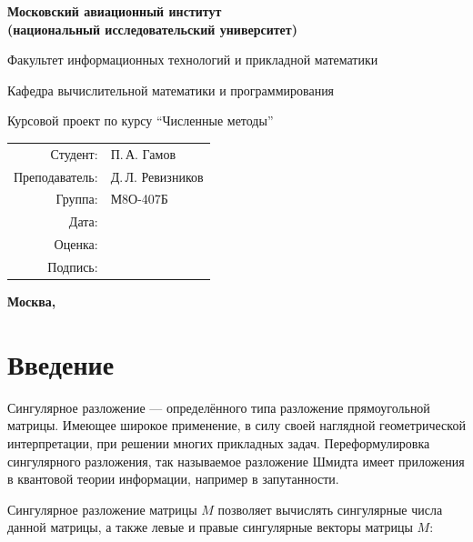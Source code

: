\documentclass[pdf, unicode, 12pt, a4paper,oneside,fleqn]{article}
\begin{document}
\begin{titlepage}
\begin{center}
\bfseries
{\Large Московский авиационный институт\\ (национальный исследовательский университет)}

\vspace{48pt}
{\large Факультет информационных технологий и прикладной математики}

\vspace{36pt}
{\large Кафедра вычислительной математики и программирования}

\vspace{48pt}Курсовой проект по курсу 
\enquote{Численные методы}
\end{center}
\vspace{72pt}

\begin{flushright}
\begin{tabular}{rl}
Студент: & П.\,А. Гамов \\
Преподаватель: & Д.\,Л. Ревизников \\
Группа: & М8О-407Б \\
Дата: & \\
Оценка: & \\
Подпись: & \\
\end{tabular}
\end{flushright}
\vfill
\begin{center}
\bfseries
Москва, \the\year
\end{center}
\end{titlepage}

\pagebreak


\section{Введение}

Сингулярное разложение — определённого типа разложение прямоугольной матрицы. Имеющее широкое применение, в силу своей наглядной геометрической интерпретации, при решении многих прикладных задач. Переформулировка сингулярного разложения, так называемое разложение Шмидта имеет приложения в квантовой теории информации, например в запутанности.

Сингулярное разложение матрицы $M$ позволяет вычислять сингулярные числа данной матрицы, а также левые и правые сингулярные векторы матрицы $M$:
\end{document}
